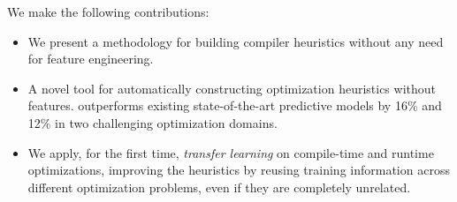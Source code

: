 We make the following contributions:
%
\begin{itemize}
\item We present a methodology for building compiler heuristics without any need for feature engineering.
\item A novel tool \DeepTune%
      for automatically constructing optimization heuristics without features. \DeepTune outperforms existing state-of-the-art predictive models by 16\% and 12\% in two challenging optimization domains.
\item We apply, for the first time, \emph{transfer learning} on compile-time and runtime optimizations, improving the heuristics by reusing training information across different optimization problems, even if they are completely unrelated.
\end{itemize}
